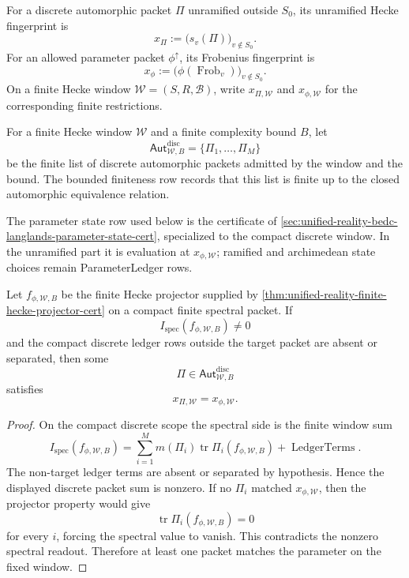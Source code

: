 \begin{definition}
\label{def:unified-reality-hecke-spectral-fingerprint}
For a discrete automorphic packet $\Pi$ unramified outside $S_0$, its
unramified Hecke fingerprint is
$$
x_{\Pi}
:=
\bigl(s_v(\Pi)\bigr)_{v\notin S_0}.
$$
For an allowed parameter packet $\phi^{\uparrow}$, its Frobenius
fingerprint is
$$
x_{\phi}
:=
\bigl(\phi(\operatorname{Frob}_v)\bigr)_{v\notin S_0}.
$$
On a finite Hecke window $\mathcal W=(S,R,\mathcal B)$, write
$x_{\Pi,\mathcal W}$ and $x_{\phi,\mathcal W}$ for the corresponding
finite restrictions.
\end{definition}

\begin{definition}
\label{def:unified-reality-compact-finite-spectral-packet}
For a finite Hecke window $\mathcal W$ and a finite complexity bound
$B$, let
$$
\mathsf{Aut}_{\mathcal W,B}^{\mathrm{disc}}
=
\{\Pi_1,\ldots,\Pi_M\}
$$
be the finite list of discrete automorphic packets admitted by the
window and the bound. The bounded finiteness row records that this list
is finite up to the closed automorphic equivalence relation.
\end{definition}

The parameter state row used below is the certificate of
\autoref{sec:unified-reality-bedc-langlands-parameter-state-cert},
specialized to the compact discrete window. In the unramified part it is
evaluation at $x_{\phi,\mathcal W}$; ramified and archimedean state
choices remain ParameterLedger rows.

\begin{theorem}
\label{thm:unified-reality-fixed-window-spectral-realization}
Let $f_{\phi,\mathcal W,B}$ be the finite Hecke projector supplied by
\autoref{thm:unified-reality-finite-hecke-projector-cert} on a compact
finite spectral packet. If
$$
I_{\mathrm{spec}}(f_{\phi,\mathcal W,B})\ne0
$$
and the compact discrete ledger rows outside the target packet are absent
or separated, then some
$$
\Pi\in\mathsf{Aut}_{\mathcal W,B}^{\mathrm{disc}}
$$
satisfies
$$
x_{\Pi,\mathcal W}=x_{\phi,\mathcal W}.
$$
\end{theorem}
\begin{proof}
On the compact discrete scope the spectral side is the finite window
sum
$$
I_{\mathrm{spec}}(f_{\phi,\mathcal W,B})
=
\sum_{i=1}^{M}
m(\Pi_i)\operatorname{tr}\Pi_i(f_{\phi,\mathcal W,B})
+\operatorname{LedgerTerms}.
$$
The non-target ledger terms are absent or separated by hypothesis.
Hence the displayed discrete packet sum is nonzero. If no
$\Pi_i$ matched $x_{\phi,\mathcal W}$, then the projector property would
give
$$
\operatorname{tr}\Pi_i(f_{\phi,\mathcal W,B})=0
$$
for every $i$, forcing the spectral value to vanish. This contradicts
the nonzero spectral readout. Therefore at least one packet matches the
parameter on the fixed window.
\end{proof}

